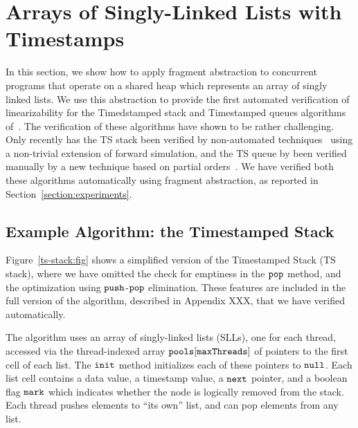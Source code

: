 \section{Arrays of Singly-Linked Lists with Timestamps}

In this section, we show how to apply fragment abstraction to concurrent
programs that  operate on a shared heap which represents
an array of singly linked lists.
We use this abstraction to provide the first automated verification of
linearizability for the Timedstamped stack and
Timestamped queues algorithms of~\cite{ts-stack}. The verification of
these algorithms have shown to be rather challenging. Only
recently has the TS stack been verified by non-automated
techniques~\cite{bouajjani:icalp17:rep} using a non-trivial extension of
forward simulation, and the TS queue by been verified manually by a new technique
based on partial orders~\cite{ts-stack}.
We have verified both these algorithms automatically using fragment abstraction,
as reported in Section~\ref{section:experiments}.

\subsection{Example Algorithm: the Timestamped Stack}



Figure~\ref{ts-stack:fig} shows a simplified version of the Timestamped Stack (TS stack), where we have omitted the check for emptiness in the ${\tt pop}$ method, and the optimization using ${\tt push}$-${\tt pop}$ elimination. These features are included in the full version of the algorithm, described in Appendix XXX, that we have verified automatically.

The algorithm uses an array of singly-linked lists (SLLs), one for each thread, accessed via the thread-indexed array ${\tt pools[maxThreads]}$ of pointers to the first cell of each list. The ${\tt init}$ method initializes each of these pointers to ${\tt null}$. Each list cell contains a data value, a timestamp value, a ${\tt next}$ pointer, and a boolean flag ${\tt mark}$ which indicates whether the node is logically removed from the stack. Each thread pushes elements to ``its own'' list, and can pop elements from any list.

